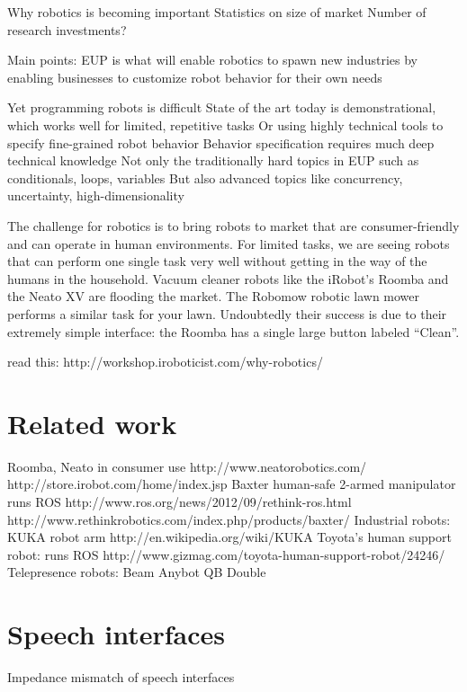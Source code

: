 \documentclass{article}
\begin{document}
Why robotics is becoming important
Statistics on size of market
Number of research investments?

Main points:
	EUP is what will enable robotics to spawn new industries
	by enabling businesses to customize robot behavior for their own needs

	Yet programming robots is difficult
	State of the art today is demonstrational, which works well for limited, repetitive tasks
	Or using highly technical tools to specify fine-grained robot behavior
	Behavior specification requires much deep technical knowledge
	Not only the traditionally hard topics in EUP such as conditionals, loops, variables
	But also advanced topics like concurrency, uncertainty, high-dimensionality

The challenge for robotics is to bring robots to market that are consumer-friendly and can operate in human environments. For limited tasks, we are seeing robots that can perform one single task very well without getting in the way of the humans in the household. Vacuum cleaner robots like the iRobot's Roomba and the Neato XV are flooding the market. The Robomow robotic lawn mower performs a similar task for your lawn. Undoubtedly their success is due to their extremely simple interface: the Roomba has a single large button labeled ``Clean''.


read this: http://workshop.iroboticist.com/why-robotics/

\section{Related work}

Roomba, Neato in consumer use
	http://www.neatorobotics.com/
	http://store.irobot.com/home/index.jsp
Baxter human-safe 2-armed manipulator
	runs ROS
	http://www.ros.org/news/2012/09/rethink-ros.html
	http://www.rethinkrobotics.com/index.php/products/baxter/
Industrial robots:
	KUKA robot arm http://en.wikipedia.org/wiki/KUKA
Toyota's human support robot:
	runs ROS
	http://www.gizmag.com/toyota-human-support-robot/24246/
Telepresence robots:
	Beam
	Anybot QB
	Double


\section{Speech interfaces}

Impedance mismatch of speech interfaces



\end{document}
